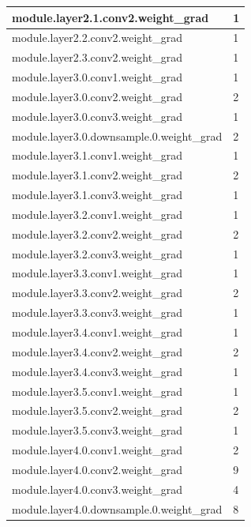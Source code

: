 \documentclass[12pt,letterpaper]{article}
\begin{document}
\begin{appendices}
\begin{longtable}{@{}ll@{}}
module.layer2.1.conv2.weight\_grad        & 1    \\ \midrule
module.layer2.2.conv2.weight\_grad        & 1    \\ \midrule
module.layer2.3.conv2.weight\_grad        & 1    \\ \midrule
module.layer3.0.conv1.weight\_grad        & 1    \\ \midrule
module.layer3.0.conv2.weight\_grad        & 2    \\ \midrule
module.layer3.0.conv3.weight\_grad        & 1    \\ \midrule
module.layer3.0.downsample.0.weight\_grad & 2    \\ \midrule
module.layer3.1.conv1.weight\_grad        & 1    \\ \midrule
module.layer3.1.conv2.weight\_grad        & 2    \\ \midrule
module.layer3.1.conv3.weight\_grad        & 1    \\ \midrule
module.layer3.2.conv1.weight\_grad        & 1    \\ \midrule
module.layer3.2.conv2.weight\_grad        & 2    \\ \midrule
module.layer3.2.conv3.weight\_grad        & 1    \\ \midrule
module.layer3.3.conv1.weight\_grad        & 1    \\ \midrule
module.layer3.3.conv2.weight\_grad        & 2    \\ \midrule
module.layer3.3.conv3.weight\_grad        & 1    \\ \midrule
module.layer3.4.conv1.weight\_grad        & 1    \\ \midrule
module.layer3.4.conv2.weight\_grad        & 2    \\ \midrule
module.layer3.4.conv3.weight\_grad        & 1    \\ \midrule
module.layer3.5.conv1.weight\_grad        & 1    \\ \midrule
module.layer3.5.conv2.weight\_grad        & 2    \\ \midrule
module.layer3.5.conv3.weight\_grad        & 1    \\ \midrule
module.layer4.0.conv1.weight\_grad        & 2    \\ \midrule
module.layer4.0.conv2.weight\_grad        & 9    \\ \midrule
module.layer4.0.conv3.weight\_grad        & 4    \\ \midrule
module.layer4.0.downsample.0.weight\_grad & 8    \\ \midrule

\end{longtable}
\end{appendices}
\end{document}
